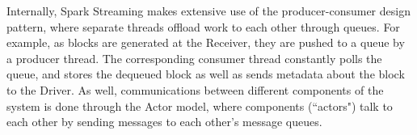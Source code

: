Internally, Spark Streaming makes extensive use of the producer-consumer design pattern, where separate threads offload work to each other through queues. For example, as blocks are generated at the Receiver, they are pushed to a queue by a producer thread. The corresponding consumer thread constantly polls the queue, and stores the dequeued block as well as sends metadata about the block to the Driver. As well, communications between different components of the system is done through the Actor model, where components (``actors") talk to each other by sending messages to each other's message queues.

